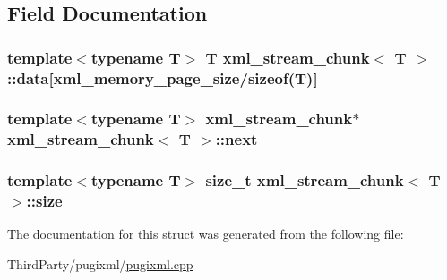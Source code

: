 \subsection{Field Documentation}
\hypertarget{structxml__stream__chunk_a365e2e228a0277467b25a0fea42b8518}{
\subsubsection[{data}]{\setlength{\rightskip}{0pt plus 5cm}template$<$typename T$>$ T {\bf xml\-\_\-stream\-\_\-chunk}$<$ T $>$\-::data\mbox{[}xml\-\_\-memory\-\_\-page\-\_\-size/sizeof(T)\mbox{]}}}\label{structxml__stream__chunk_a365e2e228a0277467b25a0fea42b8518}
\hypertarget{structxml__stream__chunk_ad00071f7340adb2bde7c4157d4100b3c}{
\subsubsection[{next}]{\setlength{\rightskip}{0pt plus 5cm}template$<$typename T$>$ {\bf xml\-\_\-stream\-\_\-chunk}$\ast$ {\bf xml\-\_\-stream\-\_\-chunk}$<$ T $>$\-::next}}\label{structxml__stream__chunk_ad00071f7340adb2bde7c4157d4100b3c}
\hypertarget{structxml__stream__chunk_a42618ba3b7bda1246cfc640149fc34eb}{
\subsubsection[{size}]{\setlength{\rightskip}{0pt plus 5cm}template$<$typename T$>$ size\-\_\-t {\bf xml\-\_\-stream\-\_\-chunk}$<$ T $>$\-::size}}\label{structxml__stream__chunk_a42618ba3b7bda1246cfc640149fc34eb}


The documentation for this struct was generated from the following file\-:\begin{DoxyCompactItemize}
\item 
Third\-Party/pugixml/\hyperlink{pugixml_8cpp}{pugixml.\-cpp}\end{DoxyCompactItemize}
